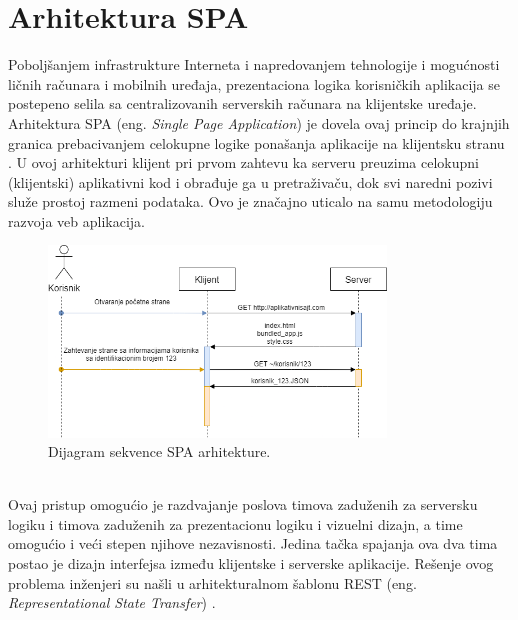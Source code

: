 \documentclass[12pt,oneside]{memoir}
\begin{document}




\chapter{Arhitektura SPA}
Poboljšanjem infrastrukture Interneta i napredovanjem tehnologije i mogućnosti
ličnih računara
i mobilnih uređaja, prezentaciona logika korisničkih aplikacija se postepeno
selila sa centralizovanih
serverskih računara na klijentske uređaje. Arhitektura SPA (eng. \emph{Single Page Application}) je dovela ovaj princip
do krajnjih granica
prebacivanjem celokupne logike ponašanja aplikacije na klijentsku stranu \cite{SPA}. U ovoj arhitekturi klijent
pri prvom zahtevu
ka serveru preuzima celokupni (klijentski) aplikativni kod i obrađuje ga u
pretraživaču, dok
svi naredni pozivi služe prostoj razmeni podataka. Ovo je značajno uticalo
na samu metodologiju razvoja veb aplikacija.
\begin{figure}[!ht]
  \centering
  \includegraphics[width=0.8\textwidth]{slike/SPA_Diagram (3).png}
  \caption{Dijagram sekvence SPA arhitekture.}
  \label{fig:SPA}
\end{figure}\\
Ovaj pristup omogućio je razdvajanje poslova timova zaduženih za
serversku logiku i timova zaduženih za prezentacionu logiku i vizuelni dizajn,
a time omogućio i veći stepen njihove nezavisnosti.
Jedina tačka spajanja ova dva tima postao je dizajn interfejsa
između klijentske i serverske aplikacije. Rešenje ovog problema inženjeri su našli
u arhitekturalnom šablonu REST (eng. \emph{Representational State Transfer}) \cite{REST}.
\end{document}
